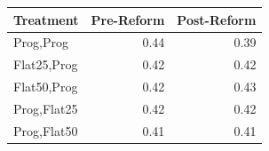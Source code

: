 \begin{tabular}{lrr}
\toprule
Treatment & Pre-Reform & Post-Reform \\
\midrule
Prog,Prog & 0.44 & 0.39 \\
Flat25,Prog & 0.42 & 0.42 \\
Flat50,Prog & 0.42 & 0.43 \\
Prog,Flat25 & 0.42 & 0.42 \\
Prog,Flat50 & 0.41 & 0.41 \\
\bottomrule
\end{tabular}
